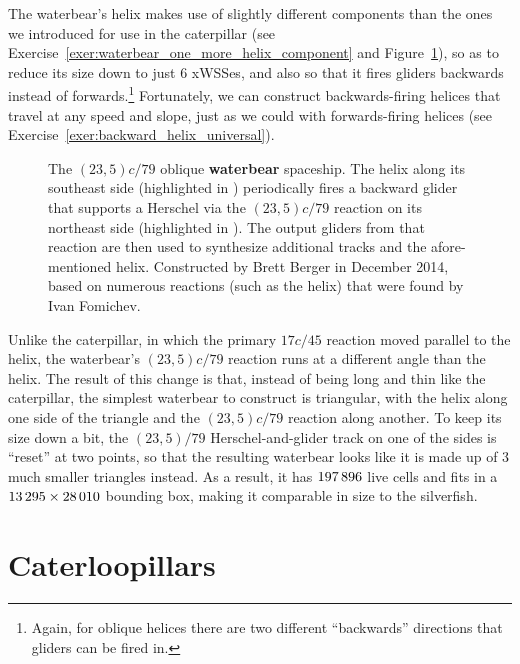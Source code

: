 The waterbear's helix makes use of slightly different components than the ones we introduced for use in the caterpillar (see Exercise~\ref{exer:waterbear_one_more_helix_component} and Figure~\ref{fig:waterbear}), so as to reduce its size down to just $6$ xWSSes, and also so that it fires gliders backwards instead of forwards.\footnote{Again, for oblique helices there are two different ``backwards'' directions that gliders can be fired in.} Fortunately, we can construct backwards-firing helices that travel at any speed and slope, just as we could with forwards-firing helices (see Exercise~\ref{exer:backward_helix_universal}).

\begin{figure}[!htbp]
	\centering
	\caption{The $(23,5)c/79$ oblique \textbf{waterbear} spaceship. The helix along its southeast side (highlighted in ) periodically fires a backward glider that supports a Herschel via the $(23,5)c/79$ reaction on its northeast side (highlighted in ). The output gliders from that reaction are then used to synthesize additional tracks and the afore-mentioned helix. Constructed by Brett Berger in December 2014, based on numerous reactions (such as the helix) that were found by Ivan Fomichev.}\label{fig:waterbear}
\end{figure}

Unlike the caterpillar, in which the primary $17c/45$ reaction moved parallel to the helix, the waterbear's $(23,5)c/79$ reaction runs at a different angle than the helix. The result of this change is that, instead of being long and thin like the caterpillar, the simplest waterbear to construct is triangular, with the helix along one side of the triangle and the $(23,5)c/79$ reaction along another. To keep its size down a bit, the $(23,5)/79$ Herschel-and-glider track on one of the sides is ``reset'' at two points, so that the resulting waterbear looks like it is made up of $3$ much smaller triangles instead. As a result, it has $197{\,}896$ live cells and fits in a $13{\,}295 \times 28{\,}010$ bounding box, making it comparable in size to the silverfish.



\section{Caterloopillars}\label{sec:caterloopillar}

